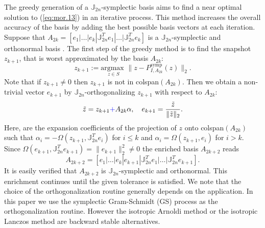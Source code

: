 The greedy generation of a $\mathbb J_{2n}$-symplectic basis aims to find a near optimal solution to (\ref{eq:mor.13}) in an iterative process. This method increases the overall accuracy of the basis by adding the best possible basis vectors at each iteration. Suppose that $A_{2k} = [e_1|\dots|e_k|\mathbb J_{2n}^T e_1|\dots|\mathbb J_{2n}^T e_k]$  is a $\mathbb J_{2n}$-symplectic and orthonormal basis \cite{doi:10.1137/17M1111991}. The first step of the greedy method is to find the snapshot $z_{k+1}$, that is worst approximated by the basis $A_{2k}$:
\begin{equation} \label{eq:mor.14}
	z_{k+1} := \underset{z \in S}{\text{argmax } }\| z - P^\text{symp}_{I,A_{2k}}(z) \|_2.
\end{equation}
Note that if $z_{k+1}\neq 0$ then $z_{k+1}$ is not in colspan$(A_{2k})$. Then we obtain a non-trivial vector $e_{k+1}$ by $\mathbb J_{2n}$-orthogonalizing $z_{k+1}$ with respect to $A_{2k}$:
\begin{equation} \label{eq:mor.14.1}
	\tilde z = z_{k+1} \editA{+} A_{2k}\alpha, \quad e_{k+1} = \frac{\tilde z}{\|\tilde z \|_2}.
\end{equation}
Here,  are the expansion coefficients of the projection of $z$ onto colspan$(A_{2k})$ such that $\alpha_i = -\Omega(z_{k+1},\mathbb J_{2n}^Te_i)$ for $i\leq k$ and $\alpha_i = \Omega(z_{k+1},e_i)$ for $i>k$. Since $\Omega(e_{k+1},\mathbb{J}_{2n}^T e_{k+1}) = \| e_{k+1} \|_2^2 \neq 0$ the enriched basis $A_{2k+2}$ reads
\begin{equation} \label{eq:mor.15}
	A_{2k+2} = [e_1|\dots|e_k|e_{k+1}|\mathbb J_{2n}^Te_1|\dots|\mathbb J_{2n}^Te_{k+1}].	
\end{equation}
It is easily verified that $A_{2k+2}$ is $\mathbb J_{2n}$-symplectic and orthonormal. This enrichment continues until the given tolerance is satisfied. We note that the choice of the orthogonalization routine generally depends on the application. In this paper we use the symplectic  Gram-Schmidt (GS) process as the orthogonalization routine. However the isotropic Arnoldi method  or the isotropic Lanczos method \cite{doi:10.1137/S1064827500366434} are backward stable alternatives.

